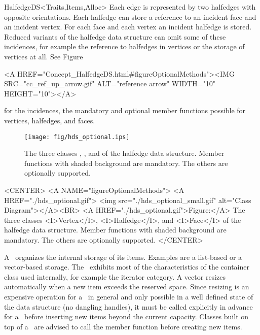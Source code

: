 \begin{ccRefConcept}{HalfedgeDS<Traits,Items,Alloc>}
Each edge is represented by two halfedges with opposite orientations.
Each halfedge can store a reference to an incident face and an
incident vertex.  For each face and each vertex an incident halfedge
is stored.  Reduced variants of the halfedge data structure can omit
some of these incidences, for example the reference to halfedges in
vertices or the storage of vertices at all. See 
Figure~\ccTexHtml{\ref{figureOptionalMethods}}{}\begin{ccHtmlOnly}
  <A HREF="Concept_HalfedgeDS.html#figureOptionalMethods"><IMG 
  SRC="cc_ref_up_arrow.gif" ALT="reference arrow" WIDTH="10" HEIGHT="10"></A>
\end{ccHtmlOnly}
for the incidences, the mandatory and optional member functions
possible for vertices, halfedges, and faces.

\begin{ccTexOnly}
    \begin{figure}[bht]
        \begin{center}
          \parbox{\textwidth}{%
              \texttt{[image: fig/hds\_optional.ips]}%
          }
        \end{center}
        \caption{The three classes \protect{}, 
          \protect{}, and 
          \protect{} of the halfedge data structure. Member
          functions with shaded background are mandatory. The others
          are optionally supported.}
        \label{figureOptionalMethods}
    \end{figure}
\end{ccTexOnly}

\begin{ccHtmlOnly}
    <CENTER>
    <A NAME="figureOptionalMethods">
    <A HREF="./hds_optional.gif">
        <img src="./hds_optional_small.gif" 
             alt="Class Diagram"></A><BR>
    <A HREF="./hds_optional.gif">Figure:</A>
    The three classes <I>Vertex</I>, <I>Halfedge</I>, and 
          <I>Face</I> of the halfedge data structure. Member
          functions with shaded background are mandatory. The others
          are optionally supported.
    </CENTER>
\end{ccHtmlOnly}

A \ccRefName\ organizes the internal storage of its items.  Examples
are a list-based or a vector-based storage. The \ccRefName\ exhibits
most of the characteristics of the container class used internally,
for example the iterator category. A vector resizes
automatically when a new item exceeds the reserved space. Since
resizing is an expensive operation for a \ccRefName\ in general and
only possible in a well defined state of the data structure (no
dangling handles), it must be called explicitly in advance for a
\ccRefName\ before inserting new items beyond the current capacity.
Classes built on top of a \ccRefName\ are advised to call the
 member function before creating new items.


\end{ccRefConcept}
